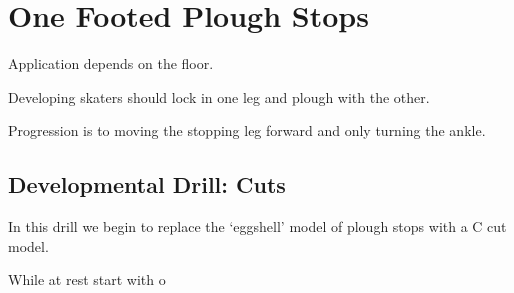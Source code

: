 \section{One Footed Plough Stops}
\label{sec:stopping/plough_one_foot}

Application depends on the floor.

Developing skaters should lock in one leg and plough with the other. 

Progression is to moving the stopping leg forward and only turning the ankle. 


\subsection{Developmental Drill: Cuts}
\label{sec:stopping/plough_one_foot/cuts}

In this drill we begin to replace the `eggshell' model of plough stops with a C cut model. 

While at rest start with o  


